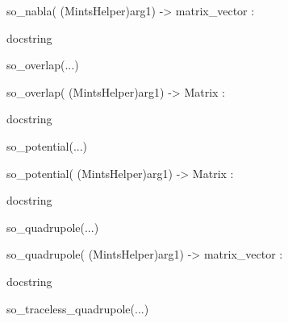 \documentclass[letterpaper,10pt,english]{sphinxmanual}
\begin{document}
\begin{description}
\begin{description}
\begin{DUlineblock}{0em}
\begin{DUlineblock}{\DUlineblockindent}
\item[] so\_nabla( (MintsHelper)arg1) -\textgreater{} matrix\_vector :
\item[]
\begin{DUlineblock}{\DUlineblockindent}
\item[] docstring
\item[] 
\end{DUlineblock}
\end{DUlineblock}
\item[] so\_overlap(...)
\item[]
\begin{DUlineblock}{\DUlineblockindent}
\item[] so\_overlap( (MintsHelper)arg1) -\textgreater{} Matrix :
\item[]
\begin{DUlineblock}{\DUlineblockindent}
\item[] docstring
\item[] 
\end{DUlineblock}
\end{DUlineblock}
\item[] so\_potential(...)
\item[]
\begin{DUlineblock}{\DUlineblockindent}
\item[] so\_potential( (MintsHelper)arg1) -\textgreater{} Matrix :
\item[]
\begin{DUlineblock}{\DUlineblockindent}
\item[] docstring
\item[] 
\end{DUlineblock}
\end{DUlineblock}
\item[] so\_quadrupole(...)
\item[]
\begin{DUlineblock}{\DUlineblockindent}
\item[] so\_quadrupole( (MintsHelper)arg1) -\textgreater{} matrix\_vector :
\item[]
\begin{DUlineblock}{\DUlineblockindent}
\item[] docstring
\item[] 
\end{DUlineblock}
\end{DUlineblock}
\item[] so\_traceless\_quadrupole(...)
\item[]

\end{DUlineblock}
\end{description}
\end{description}
\end{document}
